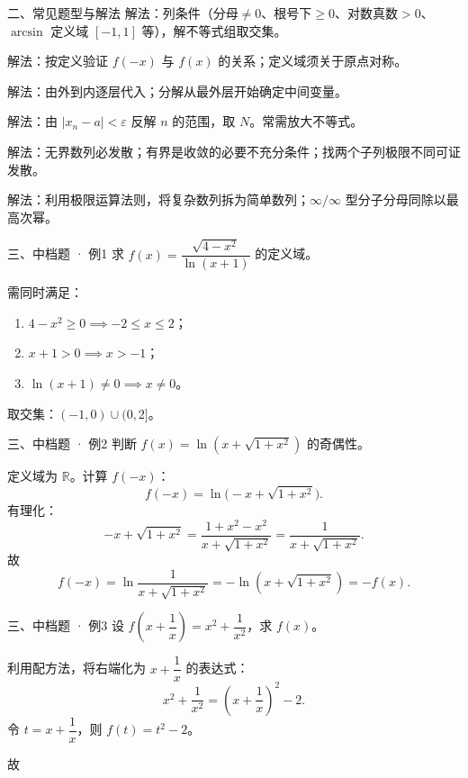 \documentclass[aspectratio=169,11pt]{beamer}
\begin{document}
\begin{frame}{二、常见题型与解法}
解法：列条件（分母$\ne 0$、根号下$\ge 0$、对数真数$>0$、$\arcsin$ 定义域 $[-1,1]$ 等），解不等式组取交集。

解法：按定义验证 $f(-x)$ 与 $f(x)$ 的关系；定义域须关于原点对称。

解法：由外到内逐层代入；分解从最外层开始确定中间变量。

解法：由 $|x_n-a|<\varepsilon$ 反解 $n$ 的范围，取 $N$。常需放大不等式。

解法：无界数列必发散；有界是收敛的必要不充分条件；找两个子列极限不同可证发散。

解法：利用极限运算法则，将复杂数列拆为简单数列；$\infty/\infty$ 型分子分母同除以最高次幂。
\end{frame}

\begin{frame}{三、中档题 · 例1}
 求 $f(x)=\dfrac{\sqrt{4-x^2}}{\ln(x+1)}$ 的定义域。

 需同时满足：
\begin{enumerate}
  \item $4-x^2\ge 0 \implies -2\le x\le 2$；
  \item $x+1>0 \implies x>-1$；
  \item $\ln(x+1)\ne 0 \implies x\ne 0$。
\end{enumerate}
取交集：$(-1,0)\cup(0,2]$。

\con{结论：定义域为 $(-1,0)\cup(0,2]$。}
\end{frame}

\begin{frame}{三、中档题 · 例2}
 判断 $f(x)=\ln(x+\sqrt{1+x^2})$ 的奇偶性。

 定义域为 $\mathbb{R}$。计算 $f(-x)$：
\[
f(-x)=\ln\bigl(-x+\sqrt{1+x^2}\bigr).
\]
有理化：
\[
-x+\sqrt{1+x^2}=\frac{1+x^2-x^2}{x+\sqrt{1+x^2}}=\frac{1}{x+\sqrt{1+x^2}}.
\]
故
\[
f(-x)=\ln\frac{1}{x+\sqrt{1+x^2}}=-\ln(x+\sqrt{1+x^2})=-f(x).
\]

\end{frame}

\begin{frame}{三、中档题 · 例3}
 设 $f(x+\dfrac1x)=x^2+\dfrac1{x^2}$，求 $f(x)$。

 利用配方法，将右端化为 $x+\dfrac1x$ 的表达式：
\[
x^2+\frac1{x^2}=\left(x+\frac1x\right)^2-2.
\]
令 $t=x+\dfrac1x$，则 $f(t)=t^2-2$。

故


\end{frame}
\end{document}
